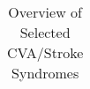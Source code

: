 



\newpage
\begin{landscape}

\begin{table}
\caption{Overview of Selected CVA/Stroke Syndromes }
\small
\label{overview} 
\centering
\begin{tabular}{l | l | l}


\end{tabular}
\end{table}
\end{landscape}
